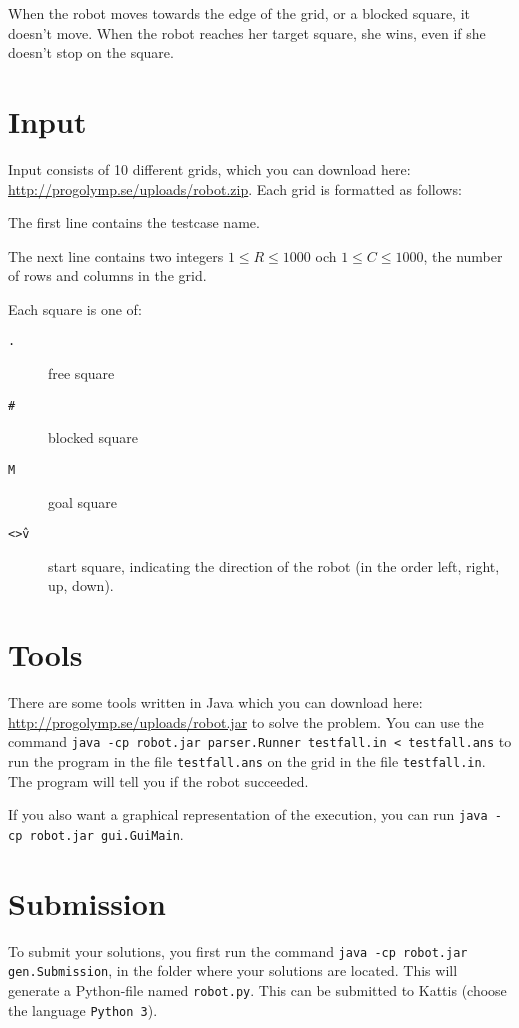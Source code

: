 When the robot moves towards the edge of the grid, or a blocked square, it doesn't move. When the robot reaches her target square, she wins, even if she doesn't stop on the square.

\section*{Input}
Input consists of 10 different grids, which you can download here: \url{http://progolymp.se/uploads/robot.zip}. Each grid is formatted as follows:

The first line contains the testcase name.

The next line contains two integers $1 \le R \le 1000$ och $1 \le C \le 1000$, the number of rows and columns in the grid.

Each square is one of:
\begin{description}
  \item[\texttt{.}] free square
  \item[\texttt{\#}] blocked square
  \item[\texttt{M}] goal square
  \item[\texttt{<>\^v}] start square, indicating the direction of the robot (in the order left, right, up, down).
\end{description}

\section*{Tools}
There are some tools written in Java which you can download here: \url{http://progolymp.se/uploads/robot.jar} to solve the problem. You can use the command \texttt{java -cp robot.jar parser.Runner testfall.in < testfall.ans} 
to run the program in the file \texttt{testfall.ans} on the grid in the file \texttt{testfall.in}. The program will tell you if the robot succeeded.

If you also want a graphical representation of the execution, you can run \texttt{java -cp robot.jar gui.GuiMain}.

\section*{Submission}
To submit your solutions, you first run the command \texttt{java -cp robot.jar gen.Submission}, in the folder where your solutions are located. This will generate a Python-file named \texttt{robot.py}.
This can be submitted to Kattis (choose the language \texttt{Python 3}).

